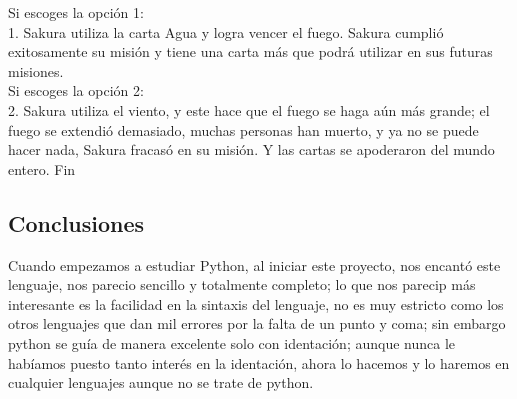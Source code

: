 \documentclass[12pt]{article}
\begin{document}
{{{\begin{flushleft}
Si escoges la opción 1:\\
1.	Sakura utiliza la carta Agua y logra vencer el fuego. Sakura cumplió exitosamente su misión y tiene una carta más que podrá utilizar en sus futuras misiones.\\
Si escoges la opción 2:\\
2.	Sakura utiliza el viento, y este hace que el fuego se haga aún más grande; el fuego se extendió demasiado, muchas personas han muerto, y ya no se puede hacer nada, Sakura fracasó en su misión. Y las cartas se apoderaron del mundo entero. Fin\\



\subsection{Conclusiones}
\vspace{0.1in}
Cuando empezamos a estudiar Python, al iniciar este proyecto, nos encantó este lenguaje, nos parecio sencillo y totalmente completo; lo que nos parecip más interesante es la facilidad en la sintaxis del lenguaje, no es muy estricto como los otros lenguajes que dan mil errores por la falta de un punto y coma; sin embargo python se guía de manera excelente solo con identación; aunque nunca le habíamos puesto tanto interés en la identación, ahora lo hacemos  y lo haremos en cualquier lenguajes aunque no se trate de python.

\newpage

\end{flushleft}}}}
\end{document}
